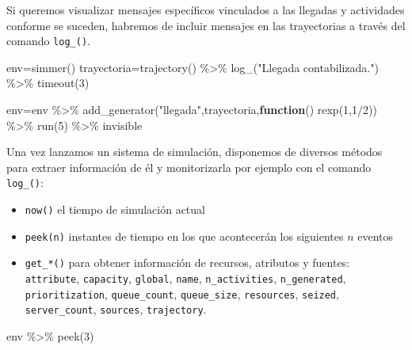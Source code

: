 \documentclass[
]{book}
\newenvironment{Shaded}{\begin{snugshade}}{\end{snugshade}}
\newcommand{\ControlFlowTok}[1]{\textcolor[rgb]{0.13,0.29,0.53}{\textbf{#1}}}
\newcommand{\DecValTok}[1]{\textcolor[rgb]{0.00,0.00,0.81}{#1}}
\newcommand{\FunctionTok}[1]{\textcolor[rgb]{0.00,0.00,0.00}{#1}}
\newcommand{\NormalTok}[1]{#1}
\newcommand{\OtherTok}[1]{\textcolor[rgb]{0.56,0.35,0.01}{#1}}
\newcommand{\SpecialCharTok}[1]{\textcolor[rgb]{0.00,0.00,0.00}{#1}}
\newcommand{\StringTok}[1]{\textcolor[rgb]{0.31,0.60,0.02}{#1}}
\providecommand{\tightlist}{%
  \setlength{\itemsep}{0pt}\setlength{\parskip}{0pt}}
\theoremstyle{definition}
\theoremstyle{definition}
\theoremstyle{definition}
\theoremstyle{definition}
\theoremstyle{remark}
\begin{document}
Si queremos visualizar mensajes específicos vinculados a las llegadas y actividades conforme se suceden, habremos de incluir mensajes en las trayectorias a través del comando \texttt{log\_()}.

\begin{Shaded}
\begin{Highlighting}[]
\NormalTok{env}\OtherTok{=}\FunctionTok{simmer}\NormalTok{()}
\NormalTok{trayectoria}\OtherTok{=}\FunctionTok{trajectory}\NormalTok{() }\SpecialCharTok{\%\textgreater{}\%}
  \FunctionTok{log\_}\NormalTok{(}\StringTok{"Llegada contabilizada."}\NormalTok{) }\SpecialCharTok{\%\textgreater{}\%}
  \FunctionTok{timeout}\NormalTok{(}\DecValTok{3}\NormalTok{)}

\NormalTok{env}\OtherTok{=}\NormalTok{env }\SpecialCharTok{\%\textgreater{}\%}
  \FunctionTok{add\_generator}\NormalTok{(}\StringTok{"llegada"}\NormalTok{,trayectoria,}\ControlFlowTok{function}\NormalTok{() }\FunctionTok{rexp}\NormalTok{(}\DecValTok{1}\NormalTok{,}\DecValTok{1}\SpecialCharTok{/}\DecValTok{2}\NormalTok{)) }\SpecialCharTok{\%\textgreater{}\%}
  \FunctionTok{run}\NormalTok{(}\DecValTok{5}\NormalTok{) }\SpecialCharTok{\%\textgreater{}\%}
\NormalTok{  invisible}
\end{Highlighting}
\end{Shaded}

Una vez lanzamos un sistema de simulación, disponemos de diversos métodos para extraer información de él y monitorizarla por ejemplo con el comando \texttt{log\_()}:

\begin{itemize}
\tightlist
\item
  \texttt{now()} el tiempo de simulación actual
\item
  \texttt{peek(n)} instantes de tiempo en los que acontecerán los siguientes \(n\) eventos
\item
  \texttt{get\_*()} para obtener información de recursos, atributos y fuentes: \texttt{attribute}, \texttt{capacity}, \texttt{global}, \texttt{name}, \texttt{n\_activities}, \texttt{n\_generated}, \texttt{prioritization}, \texttt{queue\_count}, \texttt{queue\_size}, \texttt{resources}, \texttt{seized}, \texttt{server\_count}, \texttt{sources}, \texttt{trajectory}.
\end{itemize}

\begin{Shaded}
\begin{Highlighting}[]
\NormalTok{env }\SpecialCharTok{\%\textgreater{}\%}
    \FunctionTok{peek}\NormalTok{(}\DecValTok{3}\NormalTok{)}
\end{Highlighting}
\end{Shaded}
\end{document}
